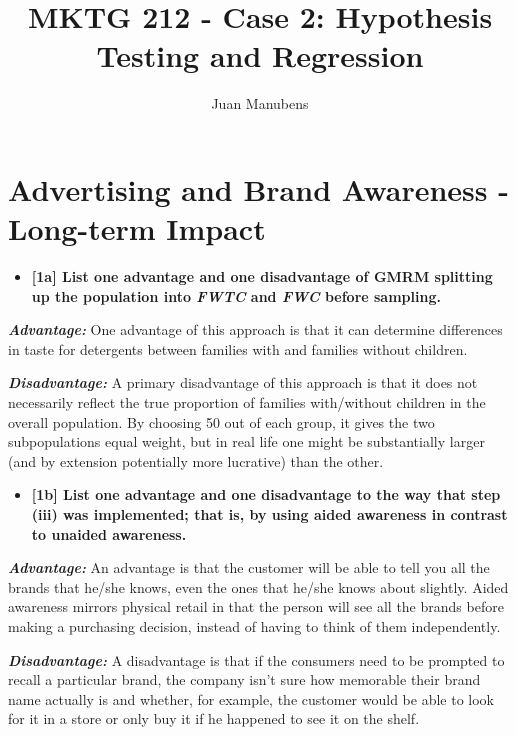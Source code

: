 \documentclass[10pt, oneside,spanish]{article}
\title{MKTG 212 - Case 2: Hypothesis Testing and Regression}
\author[]{Juan Manubens}
\affil[]{University of Pennsylvania}
\date{}
\begin{document}
\maketitle

\section{Advertising and Brand Awareness - Long-term Impact}


\begin{itemize}
\item \textbf{[1a] List one advantage and one disadvantage of GMRM splitting up the population into \textit{FWTC} and \textit{FWC} before sampling.}
\end{itemize}

\textbf{\textit{Advantage:}} One advantage of this approach is that it can determine differences in taste for detergents between families with and families without children.

\textbf{\textit{Disadvantage:}} A primary disadvantage of this approach is that it does not necessarily reflect the true proportion of families with/without children in the overall population. By choosing 50 out of each group, it gives the two subpopulations equal weight, but in real life one might be substantially larger (and by extension potentially more lucrative) than the other. 




\begin{itemize}
\item \textbf{[1b] List one advantage and one disadvantage to the way that step (iii) was implemented; that is, by using aided awareness in contrast to unaided awareness.}
\end{itemize}

\textbf{\textit{Advantage:}} An advantage is that the customer will be able to tell you all the brands that he/she knows, even the ones that he/she knows about slightly. Aided awareness mirrors physical retail in that the person will see all the brands before making a purchasing decision, instead of having to think of them independently. 

\textbf{\textit{Disadvantage:}} A disadvantage is that if the consumers need to be prompted to recall a particular brand, the company isn’t sure how memorable their brand name actually is and whether, for example, the customer would be able to look for it in a store or only buy it if he happened to see it on the shelf.
\end{document}
